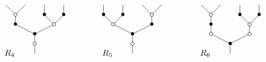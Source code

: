 \documentclass[../main.tex]{subfiles}
\begin{document}
\begin{ex}
    $$
        \xy
        <0.08cm, 0cm>:
        (0.0, 0.0)*{}="1"; %
        (0.0, 5.0)*\cir<2pt>{}="2"; %
        (0.0, 10.0)*=0{\bullet}="3"; %
        (-10.0, 15.0)*=0{\bullet}="4"; %
        (-10.0, 20.0)*\cir<2pt>{}="5"; %
        (-15.0, 25.0)*{}="6"; %
        (-5.0, 25.0)*{}="7"; %
        (10.0, 15.0)*\cir<2pt>{}="8"; %
        (5.0, 20.0)*=0{\bullet}="9"; %
        (5.0, 25.0)*{}="10"; %
        (15.0, 20.0)*=0{\bullet}="11"; %
        (15.0, 25.0)*{}="12"; %
        "1";"2" **\dir{-};
        "2";"3" **\dir{-};
        "3";"4" **\dir{-};
        "4";"5" **\dir{-};
        "5";"6" **\dir{-};
        "5";"7" **\dir{-};
        "3";"8" **\dir{-};
        "8";"9" **\dir{-};
        "9";"10" **\dir{-};
        "8";"11" **\dir{-};
        "11";"12" **\dir{-};
        (-13,0)*{R_{4}};
        \endxy
        \xy
        <0.08cm, 0cm>:
        (-10, 0.0)*{}="1";
        (10, 10.0)*{}="2";
        \endxy
        \xy
        <0.08cm, 0cm>:
        (0.0, 0.0)*{}="1"; %
        (0.0, 5.0)*\cir<2pt>{}="2"; %
        (0.0, 10.0)*=0{\bullet}="3"; %
        (-10.0, 15.0)*\cir<2pt>{}="4"; %
        (-15.0, 20.0)*=0{\bullet}="5"; %
        (-15.0, 25.0)*{}="6"; %
        (-5.0, 20.0)*=0{\bullet}="7"; %
        (-5.0, 25.0)*{}="8"; %
        (10.0, 15.0)*=0{\bullet}="9"; %
        (10.0, 20.0)*\cir<2pt>{}="10"; %
        (5.0, 25.0)*{}="11"; %
        (15.0, 25.0)*{}="12"; %
        "1";"2" **\dir{-};
        "2";"3" **\dir{-};
        "3";"4" **\dir{-};
        "4";"5" **\dir{-};
        "5";"6" **\dir{-};
        "4";"7" **\dir{-};
        "7";"8" **\dir{-};
        "3";"9" **\dir{-};
        "9";"10" **\dir{-};
        "10";"11" **\dir{-};
        "10";"12" **\dir{-};
        (-13,0)*{R_{5}};
        \endxy
        \xy
        <0.08cm, 0cm>:
        (-10, 0.0)*{}="1";
        (10, 10.0)*{}="2";
        \endxy
        \xy
        <0.08cm, 0cm>:
        (0.0, 0.0)*{}="1"; %
        (0.0, 5.0)*=0{\bullet}="2"; %
        (-10.0, 10.0)*\cir<2pt>{}="3"; %
        (-10.0, 15.0)*=0{\bullet}="4"; %
        (-10.0, 20.0)*\cir<2pt>{}="5"; %
        (-15.0, 25.0)*{}="6"; %
        (-5.0, 25.0)*{}="7"; %
        (10.0, 10.0)*\cir<2pt>{}="8"; %
        (10.0, 15.0)*\cir<2pt>{}="9"; %
        (5.0, 20.0)*=0{\bullet}="10"; %
        (5.0, 25.0)*{}="11"; %
        (15.0, 20.0)*=0{\bullet}="12"; %
        (15.0, 25.0)*{}="13"; %
        "1";"2" **\dir{-};
        "2";"3" **\dir{-};
        "3";"4" **\dir{-};
        "4";"5" **\dir{-};
        "5";"6" **\dir{-};
        "5";"7" **\dir{-};
        "2";"8" **\dir{-};
        "8";"9" **\dir{-};
        "9";"10" **\dir{-};
        "10";"11" **\dir{-};
        "9";"12" **\dir{-};
        "12";"13" **\dir{-};
        (-13,0)*{R_{6}};
        \endxy
        \xy
        <0.08cm, 0cm>:
        (-10, 0.0)*{}="1";
        (10, 10.0)*{}="2";
        \endxy
    $$


\end{ex}
\end{document}
